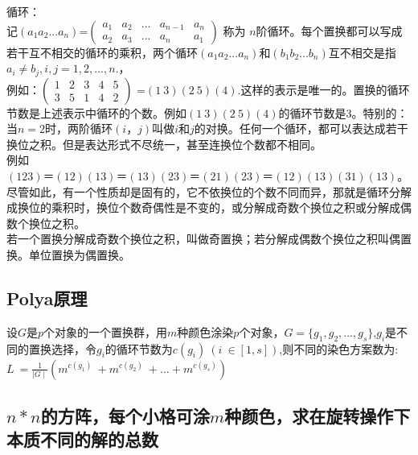 循环：\\
记$(a_1a_2...a_n)$=$\begin{pmatrix} a_1& a_2 & ... & a_{n-1} & a_n \\ a_2 & a_3   & ... & a_n & a_1 \end{pmatrix}$ 称为 $n$阶循环。每个置换都可以写成若干互不相交的循环的乘积，两个循环$(a_1a_2...a_n)$和$(b_1b_2...b_n)$互不相交是指$a_i \neq b_j,i,j=1,2,...,n$.，\\
例如：$\begin{pmatrix} 1& 2 & 3 & 4  & 5\\ 3 & 5 &  1  & 4 & 2\end{pmatrix}$ =$(1 \ 3)(2 \ 5)(4)$.这样的表示是唯一的。置换的循环节数是上述表示中循环的个数。例如$(1 \ 3)(2 \ 5)(4)$的循环节数是$3$。特别的：当$n=2$时，两阶循环$(i，j)$叫做$i$和$j$的对换。任何一个循环，都可以表达成若干换位之积。但是表达形式不尽统一，甚至连换位个数都不相同。\\
例如$(123)＝(12) (13) ＝(13) (23) ＝(21)(23)＝(12)(13)(31)(13)$。 尽管如此，有一个性质却是固有的，它不依换位的个数不同而异，那就是循环分解成换位的乘积时，换位个数奇偶性是不变的，或分解成奇数个换位之积或分解成偶数个换位之积。\\
若一个置换分解成奇数个换位之积，叫做奇置换；若分解成偶数个换位之积叫偶置换。单位置换为偶置换。\\

\subsection{Polya原理}

设$G$是$p$个对象的一个置换群，用$m$种颜色涂染$p$个对象，$G=\{g_1,g_2,...,g_s\}$,$g_i$是不同的置换选择，令$g_i$的循环节数为$c(g_i)\ (i \ \in [1,s])$,则不同的染色方案数为:$L \ = \frac{1}{\mid  G \mid}(m^{c(g_1)}\ + m^{c(g_2)}\ +... + m^{c(g_s)})$ \\

\subsection{$n*n$的方阵，每个小格可涂$m$种颜色，求在旋转操作下本质不同的解的总数}

